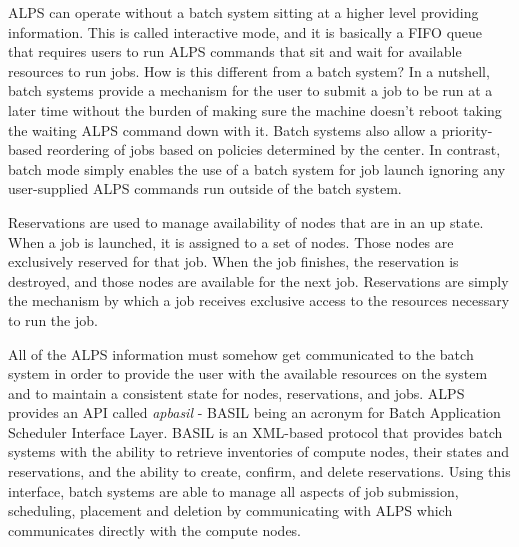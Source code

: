 ALPS can operate without a batch system sitting at a higher level providing
information.  This is called interactive mode, and it is basically a FIFO queue
that requires users to run ALPS commands that sit and wait for available
resources to run jobs.  How is this different from a batch system?  In a
nutshell, batch systems provide a mechanism for the user to submit a job to be
run at a later time without the burden of making sure the machine doesn't
reboot taking the waiting ALPS command down with it. Batch systems also allow a
priority-based reordering of jobs based on policies determined by the center.
In contrast, batch mode simply enables the use of a batch system for job launch
ignoring any user-supplied ALPS commands run outside of the batch system.

Reservations are used to manage availability of nodes that are in an up state.
When a job is launched, it is assigned to a set of nodes. Those nodes are
exclusively reserved for that job.  When the job finishes, the reservation is
destroyed, and those nodes are available for the next job.  Reservations are
simply the mechanism by which a job receives exclusive access to the resources
necessary to run the job.

All of the ALPS information must somehow get communicated to the batch system
in order to provide the user with the available resources on the system and to
maintain a consistent state for nodes, reservations, and jobs.  ALPS provides
an API called \emph{apbasil} - BASIL being an acronym for Batch Application
Scheduler Interface Layer.  BASIL is an XML-based protocol that provides batch
systems with the ability to retrieve inventories of compute nodes, their states
and reservations, and the ability to create, confirm, and delete reservations.
Using this interface, batch systems are able to manage all aspects of job
submission, scheduling, placement and deletion by communicating with ALPS which
communicates directly with the compute nodes.
